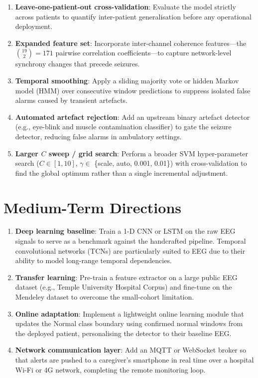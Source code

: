 \documentclass[12pt, a4paper]{report}
\begin{document}
\begin{enumerate}
  \item \textbf{Leave-one-patient-out cross-validation}: Evaluate the model
        strictly across patients to quantify inter-patient generalisation
        before any operational deployment.

  \item \textbf{Expanded feature set}: Incorporate inter-channel
        coherence features---the $\binom{19}{2}=171$ pairwise correlation
        coefficients---to capture network-level synchrony changes that
        precede seizures.

  \item \textbf{Temporal smoothing}: Apply a sliding majority vote or
        hidden Markov model (HMM) over consecutive window predictions to
        suppress isolated false alarms caused by transient artefacts.

  \item \textbf{Automated artefact rejection}: Add an upstream binary
        artefact detector (e.g., eye-blink and muscle contamination
        classifier) to gate the seizure detector, reducing false alarms
        in ambulatory settings.

  \item \textbf{Larger $C$ sweep / grid search}: Perform a broader
        SVM hyper-parameter search ($C \in [1, 10]$, $\gamma \in$
        \{scale, auto, 0.001, 0.01\}) with cross-validation to find the
        global optimum rather than a single incremental adjustment.
\end{enumerate}

\section{Medium-Term Directions}

\begin{enumerate}
  \item \textbf{Deep learning baseline}: Train a 1-D CNN or LSTM on the
        raw EEG signals to serve as a benchmark against the handcrafted
        pipeline. Temporal convolutional networks (TCNs) are particularly
        suited to EEG due to their ability to model long-range temporal
        dependencies.

  \item \textbf{Transfer learning}: Pre-train a feature extractor on a
        large public EEG dataset (e.g., Temple University Hospital Corpus)
        and fine-tune on the Mendeley dataset to overcome the small-cohort
        limitation.

  \item \textbf{Online adaptation}: Implement a lightweight online
        learning module that updates the Normal class boundary using
        confirmed normal windows from the deployed patient, personalising
        the detector to their baseline EEG.

  \item \textbf{Network communication layer}: Add an MQTT or WebSocket
        broker so that alerts are pushed to a caregiver's smartphone
        in real time over a hospital Wi-Fi or 4G network, completing
        the remote monitoring loop.
\end{enumerate}
\end{document}
